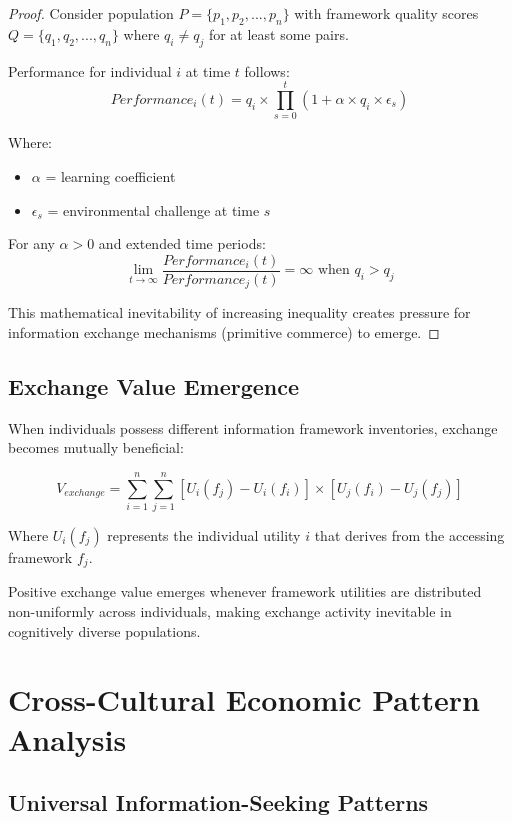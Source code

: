 \documentclass[12pt,a4paper]{article}
\begin{document}
\begin{proof}
Consider population $P = \{p_1, p_2, ..., p_n\}$ with framework quality scores $Q = \{q_1, q_2, ..., q_n\}$ where $q_i \neq q_j$ for at least some pairs.

Performance for individual $i$ at time $t$ follows:
$$Performance_i(t) = q_i \times \prod_{s=0}^{t} (1 + \alpha \times q_i \times \epsilon_s)$$

Where:
\begin{itemize}
\item $\alpha$ = learning coefficient 
\item $\epsilon_s$ = environmental challenge at time $s$
\end{itemize}

For any $\alpha > 0$ and extended time periods:
$$\lim_{t \rightarrow \infty} \frac{Performance_i(t)}{Performance_j(t)} = \infty \text{ when } q_i > q_j$$

This mathematical inevitability of increasing inequality creates pressure for information exchange mechanisms (primitive commerce) to emerge.
\end{proof}

\subsection{Exchange Value Emergence}

When individuals possess different information framework inventories, exchange becomes mutually beneficial:

\begin{equation}
V_{exchange} = \sum_{i=1}^{n} \sum_{j=1}^{n} [U_i(f_j) - U_i(f_i)] \times [U_j(f_i) - U_j(f_j)]
\end{equation}

Where $U_i(f_j)$ represents the individual utility $i$ that derives from the accessing framework $f_j$.

Positive exchange value emerges whenever framework utilities are distributed non-uniformly across individuals, making exchange activity inevitable in cognitively diverse populations.

\section{Cross-Cultural Economic Pattern Analysis}

\subsection{Universal Information-Seeking Patterns}
\end{document}
